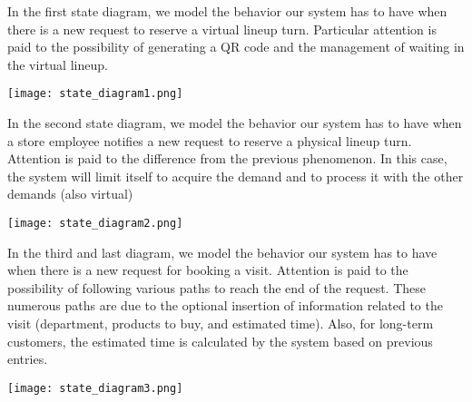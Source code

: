 In the first state diagram, we model the behavior our system has to have when there is a new request to reserve a virtual lineup turn. Particular attention is paid to the possibility of generating a QR code and the management of waiting in the virtual lineup. \newline


\texttt{[image: state\_diagram1.png]} \newline


In the second state diagram, we model the behavior our system has to have when a store employee notifies a new request to reserve a physical lineup turn. Attention is paid to the difference from the previous phenomenon. In this case, the system will limit itself to acquire the demand and to process it with the other demands (also virtual) \newline


\texttt{[image: state\_diagram2.png]} \newline


In the third and last diagram, we model the behavior our system has to have when there is a new request for booking a visit. Attention is paid to the possibility of following various paths to reach the end of the request. These numerous paths are due to the optional insertion of information related to the visit (department, products to buy, and estimated time). Also, for long-term customers, the estimated time is calculated by the system based on previous entries. \newline 

\texttt{[image: state\_diagram3.png]} \newline